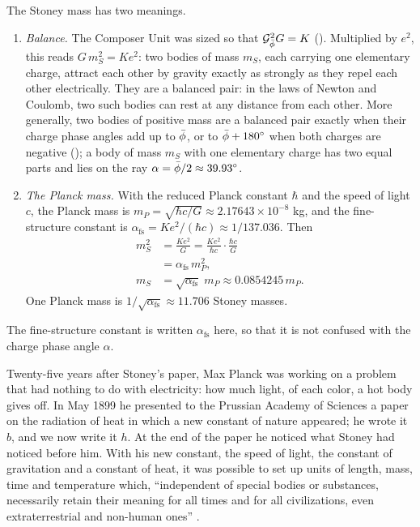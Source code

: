 \begin{remark}\label{rem:stoney-planck}
The Stoney mass has two meanings.
\begin{enumerate}
  \item \emph{Balance.} The Composer Unit was sized so that $\mathcal{G}_{\bar{\phi}}^2 G = K$ (). Multiplied by $e^2$, this reads $G\,m_S^2 = K e^2$: two bodies of mass $m_S$, each carrying one elementary charge, attract each other by gravity exactly as strongly as they repel each other electrically. They are a balanced pair: in the laws of Newton and Coulomb, two such bodies can rest at any distance from each other. More generally, two bodies of positive mass are a balanced pair exactly when their charge phase angles add up to $\bar{\phi}$, or to $\bar{\phi} + 180^\circ$ when both charges are negative (); a body of mass $m_S$ with one elementary charge has two equal parts and lies on the ray $\alpha = \bar{\phi}/2 \approx 39.93^\circ$.
  \item \emph{The Planck mass.} With the reduced Planck constant $\hbar$ and the speed of light $c$, the Planck mass is $m_P = \sqrt{\hbar c/G} \approx 2.17643 \times 10^{-8}$ kg, and the fine-structure constant is $\alpha_{\mathrm{fs}} = K e^2/(\hbar c) \approx 1/137.036$. Then
  \begin{align*}
  m_S^2 &= \frac{K e^2}{G} = \frac{K e^2}{\hbar c}\cdot\frac{\hbar c}{G} \\
  &= \alpha_{\mathrm{fs}}\, m_P^2, \\
  m_S &= \sqrt{\alpha_{\mathrm{fs}}}\; m_P \approx 0.0854245\, m_P .
  \end{align*}
  One Planck mass is $1/\sqrt{\alpha_{\mathrm{fs}}} \approx 11.706$ Stoney masses.
\end{enumerate}
\end{remark}

The fine-structure constant is written $\alpha_{\mathrm{fs}}$ here, so that it is not confused with the charge phase angle $\alpha$.


Twenty-five years after Stoney's paper, Max Planck was working on a problem that had nothing to do with electricity: how much light, of each color, a hot body gives off. In May 1899 he presented to the Prussian Academy of Sciences a paper on the radiation of heat in which a new constant of nature appeared; he wrote it $b$, and we now write it $h$. At the end of the paper he noticed what Stoney had noticed before him. With his new constant, the speed of light, the constant of gravitation and a constant of heat, it was possible to set up units of length, mass, time and temperature which, \enquote{independent of special bodies or substances, necessarily retain their meaning for all times and for all civilizations, even extraterrestrial and non-human ones} \citep{Planck1899}.

